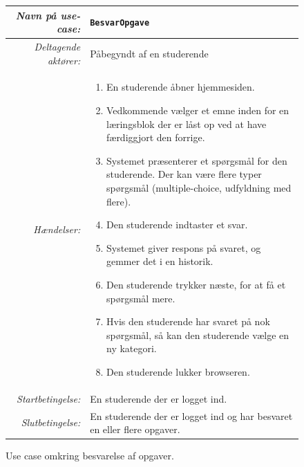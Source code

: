 \documentclass[12pt]{article}
\begin{document}
\begin{figure}[htpb]
    \centering
    \begin{tabular}{r p{10cm}}
        \toprule
        \textit{Navn på use-case:} & \verb!BesvarOpgave! \\
        \hline
        \textit{Deltagende aktører:} & Påbegyndt af en studerende \\
        \hline
        \textit{Hændelser:} & \begin{enumerate}[nolistsep]
            \item En studerende åbner hjemmesiden.
            \item Vedkommende vælger et emne inden for en læringsblok der er låst op ved at have færdiggjort den forrige.
            \item Systemet præsenterer et spørgsmål for den studerende. Der kan være flere typer spørgsmål (multiple-choice, udfyldning med flere).
            \item Den studerende indtaster et svar.
            \item Systemet giver respons på svaret, og gemmer det i en historik.
            \item Den studerende trykker næste, for at få et spørgsmål mere.
            \item Hvis den studerende har svaret på nok spørgsmål, så kan den studerende vælge en ny kategori.
            \item Den studerende lukker browseren.
        \end{enumerate}  \\
        \hline
        \textit{Startbetingelse:} & En studerende der er logget ind. \\
        \hline
        \textit{Slutbetingelse:} & En studerende der er logget ind og har besvaret en eller flere opgaver. \\
        \bottomrule
    \end{tabular}
    \caption{Use case omkring besvarelse af opgaver.}
    \label{fig:use_case2}
\end{figure}
\end{document}
